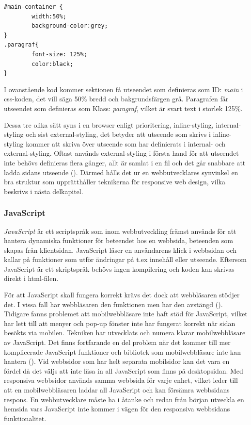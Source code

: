 \documentclass[11pt]{article}
\begin{document}
\begin{verbatim}
#main-container {
        width:50%;
        background-color:grey;
}
.paragraf{
        font-size: 125%;
        color:black;
}
\end{verbatim}
\vspace{0.5cm}

I ovanstående kod kommer sektionen få utseendet som definieras som ID: \textit{main} i css-koden, det vill säga 50\% bredd och bakgrundsfärgen grå. Paragrafen får utseendet som definieras som Klass: \textit{paragraf}, vilket är svart text i storlek 125\%.

Dessa tre olika sätt syns i en browser enligt prioritering, inline-styling, internal-styling och sist external-styling, det betyder att utseende som skrivs i inline-styling kommer att skriva över utseende som har definierats i internal- och external-styling. Oftast används external-styling i första hand för att utseendet inte behövs definieras flera gånger, allt är samlat i en fil och det går snabbare att ladda sidans utseende (\cite{css}). Därmed hålls det ur en webbutvecklares synvinkel en bra struktur som upprätthåller teknikerna för responsive web design, vilka beskrivs i nästa delkapitel.

\subsubsection{JavaScript}
\textit{JavaScript} är ett scriptspråk som inom webbutveckling främst används för att hantera dynamiska funktioner för beteendet hos en webbsida, beteenden som skapas från klientsidan. JavaScript läser en användarens klick i webbsidan och kallar på funktioner som utför ändringar på t.ex innehåll eller utseende. Eftersom JavaScript är ett skriptspråk behövs ingen kompilering och koden kan skrivas direkt i html-filen.

För att JavaScript skall fungera korrekt krävs det dock att webbläsaren stödjer det. I vissa fall har webbläsaren den funktionen men har den avstängd (\cite[s.13]{sara_ingmar}). Tidigare fanns problemet att mobilwebbläsare inte haft stöd för JavaScript, vilket har lett till att menyer och pop-up fönster inte har fungerat korrekt när sidan besökts via mobilen. Tekniken har utvecklats och numera klarar mobilwebbläsare av JavaScript. Det finns fortfarande en del problem när det kommer till mer komplicerade JavaScript funktioner och bibliotek som mobilwebbläsare inte kan hantera (\cite{quirksmode}). Vid webbsidor som har helt separata mobilsidor kan det vara en fördel då det väljs att inte läsa in all JavaScript som finns på desktopsidan. Med responsiva webbsidor används samma webbsida för varje enhet, vilket leder till att en mobilwebbläsaren laddar all JavaScript och kan försämra webbsidans respons. En webbutvecklare måste ha i åtanke och redan från början utveckla en hemsida vars JavaScript inte kommer i vägen för den responsiva webbsidans funktionalitet.
\newpage
\end{document}

